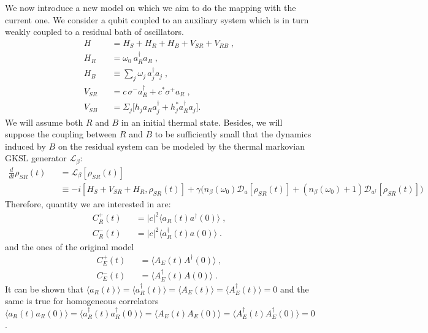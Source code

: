 \documentclass[%
 reprint,
 amsmath,amssymb,
 aps,
]{revtex4-2}
\begin{document}
We now introduce a new model on which we aim to do the mapping with the current one. We consider a qubit coupled to an auxiliary system which is in turn weakly coupled to a residual bath of oscillators.
\begin{eqnarray}
    H &&= H_S + H_R + H_B + V_{SR} + V_{RB} \; ,
    \\
    H_R &&= \omega_0 \: a_R^\dagger a _R \; ,
    \\
    H_B &&\equiv \sum_j \omega_j \,  a^\dagger _j a_j \; ,
    \\
    V_{SR} &&=  c \, \sigma^- a^\dagger_R + c^* \sigma^+ a_R \; ,
    \\
    V_{SB} &&=  \Sigma_j \big[ h_j a_R a^\dagger_j + h_j^* a_R^\dagger a_j  \big].    
\end{eqnarray}
We will assume both $R$ and $B$ in an initial thermal state. Besides, we will suppose the coupling between $R$ and $B$ to be sufficiently small that the dynamics induced by $B$ on the residual system can be modeled by the thermal markovian GKSL generator $\mathcal{L_\beta}$:
\begin{eqnarray}   
    \frac{d}{dt} \rho_{SR}(t) &&= \mathcal{L_\beta}[\rho_{SR}(t)] \\
    &&\equiv -i [H_S+V_{SR} + H_R, \rho_{SR}(t)]+ \gamma \big( n_\beta(\omega_0) \mathcal{D}_a [\rho_{SR}(t)] +(n_\beta(\omega_0) +1)\mathcal{D}_{a^\dagger} [\rho_{SR}(t)] \big) 
\end{eqnarray}
Therefore, quantity we are interested in are:
\begin{eqnarray}
    C_R^+(t) &&= |c|^2 \langle a_R(t) a^\dagger (0) \rangle \; ,
    \\
    C_R^- (t) &&= |c|^2 \langle a_R^\dagger(t) a (0) \rangle \; .
    
\end{eqnarray}
and the ones of the original model 
\begin{eqnarray}
    C_E^+(t) &&=  \langle A_E(t) A^\dagger (0) \rangle \; ,
    \\
    C_E^- (t) &&=  \langle A_E^\dagger(t) A (0) \rangle \; .
    
\end{eqnarray}
It can be shown that $\langle a_R (t) \rangle = \langle a^\dagger_R (t) \rangle = \langle A_E (t) \rangle = \langle A^\dagger_E (t) \rangle =0$ and the same is true for homogeneous correlators $\langle a_R (t) a_R (0) \rangle = \langle a^\dagger_R (t) a^\dagger_R (0) \rangle = \langle A_E (t) A_E (0) \rangle = \langle A^\dagger_E (t) A^\dagger_E (0) \rangle =0$.\\

\end{document}
